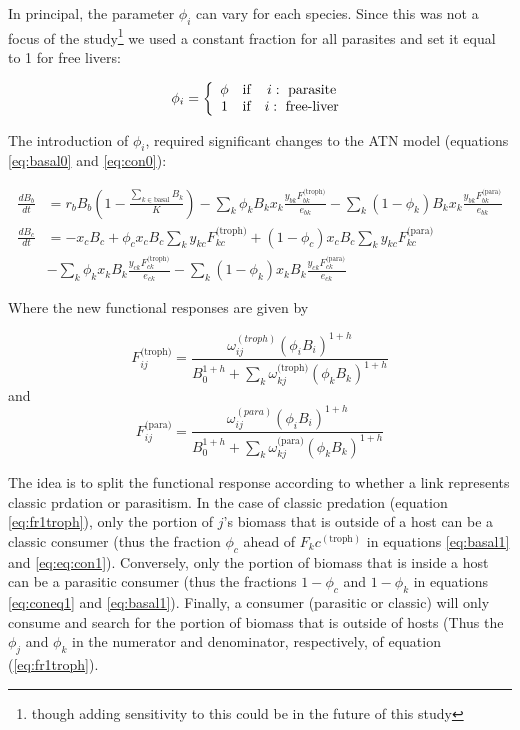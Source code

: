 \documentclass[11pt]{amsart}
\begin{document}
In principal, the parameter $\phi_i$ can vary for each species.  Since this was not a focus of the study\footnote{though adding sensitivity to this could be in the future of this study} we used a constant fraction for all parasites and set it equal to 1 for free livers:

\begin{equation}
\phi_i = 
\left\{
\begin{array}{c c c}
\phi & \text{if} & i:\text{ parasite}\\
1 & \text{if} & i:\text{ free-liver}\\
\end{array}
\right.\label{phidef}
\end{equation}

The introduction of $\phi_i$, required significant changes to the ATN model (equations \ref{eq:basal0} and \ref{eq:con0}):

\begin{align}
\frac{dB_{b}}{dt} &= r_bB_b\left(1-\frac{\sum_{k\in\text{basal}}B_k}{K}\right) - \sum_k\phi_kB_kx_k\frac{y_{bk}F_{bk}^\text{(troph)}}{e_{bk}} - \sum_k(1-\phi_k)B_kx_k\frac{y_{bk}F^\text{(para)}_{bk}}{e_{bk}}\label{eq:basal1} \\ 
\frac{dB_{c}}{dt} &= -x_cB_c + \phi_cx_cB_c\sum_ky_{kc}F^\text{(troph)}_{kc} + (1-\phi_c)x_cB_c\sum_ky_{kc}F^\text{(para)}_{kc} \label{eq:con1}\\ 
& - \sum_k \phi_kx_kB_k\frac{y_{ck}F^\text{(troph)}_{ck}}{e_{ck}} - \sum_k (1-\phi_k)x_kB_k\frac{y_{ck}F^\text{(para)}_{ck}}{e_{ck}}\nonumber
\end{align}

Where the new functional responses are given by 

\begin{equation}
F_{ij}^\text{(troph)} = \frac{\omega_{ij}^{(troph)}(\phi_iB_i)^{1+h}}{B_0^{1+h} + \sum_k\omega^\text{(troph)}_{kj}(\phi_kB_k)^{1+h}} \label{eq:fr1troph}
\end{equation}
and
\begin{equation}
F_{ij}^\text{(para)} = \frac{\omega_{ij}^{(para)}(\phi_iB_i)^{1+h}}{B_0^{1+h} + \sum_k\omega^\text{(para)}_{kj}(\phi_kB_k)^{1+h}} \label{eq:fr1para}
\end{equation}

The idea is to split the functional response according to whether a link represents classic prdation or parasitism.  In the case of classic predation (equation \ref{eq:fr1troph}), only the portion of $j$'s biomass that is outside of a host can be a classic consumer (thus the fraction $\phi_c$ ahead of $F_kc^(\text{troph})$ in equations \ref{eq:basal1} and \ref{eq:eq:con1}).  Conversely, only the portion of biomass that is inside a host can be a parasitic consumer (thus the fractions $1-\phi_c$ and $1-\phi_k$ in equations \ref{eq:coneq1} and \ref{eq:basal1}).  Finally, a consumer (parasitic or classic) will only consume and search for the portion of biomass that is outside of hosts (Thus the $\phi_j$ and $\phi_k$ in the numerator and denominator, respectively, of equation (\ref{eq:fr1troph}).
\end{document}
